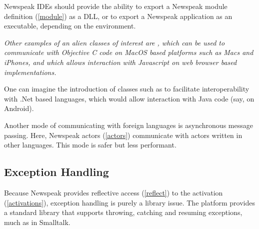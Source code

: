 \documentclass{article}
\begin{document}
Newspeak IDEs should provide the ability to export a Newspeak module definition  (\ref{module}) as a DLL, or to export a Newspeak application as an executable, depending on the environment.

{\it 
Other examples of an alien classes of interest are , which can be used to communicate with Objective C code on MacOS based platforms such as Macs and iPhones, and
 which allows interaction with Javascript on web browser based implementations.

One can imagine the introduction of classes such as  to facilitate interoperability with .Net based languages,  which would allow interaction with Java code (say, on Android). 
}

Another mode of communicating with foreign languages is asynchronous message passing. Here, Newspeak actors (\ref{actors}) communicate with actors written in other languages. This mode is safer but less performant.

\subsection{Exception Handling}
\label{exceptions}

Because Newspeak provides reflective access (\ref{reflect}) to the activation (\ref{activations}), exception handling is purely a library issue. The platform provides a standard library that supports throwing, catching and resuming exceptions, much as in Smalltalk.


 
\end{document}
